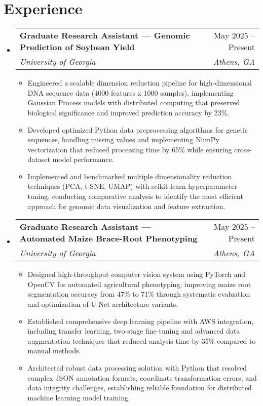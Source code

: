 \documentclass[letterpaper,10.5pt]{article}
\makeatletter
\newcommand{\resumeItem}[1]{
  \item\small{
    {#1 \vspace{-3pt}}
  }
}
\newcommand{\resumeSubheading}[4]{
  \vspace{-2pt}\item
    \begin{tabular*}{0.97\textwidth}{l@{\extracolsep{\fill}}r}
      \textbf{#1} & #2 \\
      \textit{\small#3} & \textit{\small #4} \\
    \end{tabular*}\vspace{-6pt}
}
\newcommand{\resumeSubHeadingListStart}{\begin{itemize}[leftmargin=*]}
\newcommand{\resumeSubHeadingListEnd}{\end{itemize}}
\newcommand{\resumeItemListStart}{\begin{itemize}}
\newcommand{\resumeItemListEnd}{\end{itemize}\vspace{-6pt}}
\makeatother
\begin{document}
\section{Experience}
  \resumeSubHeadingListStart
    \resumeSubheading
      {Graduate Research Assistant — Genomic Prediction of Soybean Yield}{May 2025 -- Present}
      {University of Georgia}{Athens, GA}
      \resumeItemListStart
        \resumeItem{Engineered a scalable dimension reduction pipeline for high-dimensional DNA sequence data (4000 features x 1000 samples), implementing Gaussian Process models with distributed computing that preserved biological significance and improved prediction accuracy by 23\%.}
        \resumeItem{Developed optimized Python data preprocessing algorithms for genetic sequences, handling missing values and implementing NumPy vectorization that reduced processing time by 65\% while ensuring cross-dataset model performance.}
        \resumeItem{Implemented and benchmarked multiple dimensionality reduction techniques (PCA, t-SNE, UMAP) with scikit-learn hyperparameter tuning, conducting comparative analysis to identify the most efficient approach for genomic data visualization and feature extraction.}
      \resumeItemListEnd
      
    \resumeSubheading
      {Graduate Research Assistant — Automated Maize Brace-Root Phenotyping}{May 2025 -- Present}
      {University of Georgia}{Athens, GA}
      \resumeItemListStart
        \resumeItem{Designed high-throughput computer vision system using PyTorch and OpenCV for automated agricultural phenotyping, improving maize root segmentation accuracy from 47\% to 71\% through systematic evaluation and optimization of U-Net architecture variants.}
        \resumeItem{Established comprehensive deep learning pipeline with AWS integration, including transfer learning, two-stage fine-tuning and advanced data augmentation techniques that reduced analysis time by 35\% compared to manual methods.}
        \resumeItem{Architected robust data processing solution with Python that resolved complex JSON annotation formats, coordinate transformation errors, and data integrity challenges, establishing reliable foundation for distributed machine learning model training.}
      \resumeItemListEnd
  \resumeSubHeadingListEnd

\end{document}

